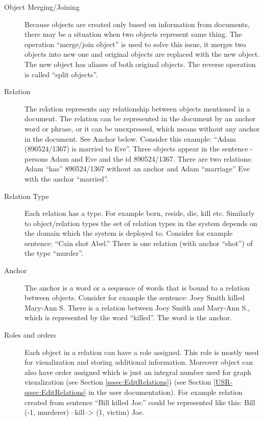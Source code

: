 \begin{description}
\item[Object Merging/Joining]
Because objects are created only based on information from documents, there may
be a situation when two objects represent same thing. The operation ``merge/join
object'' is used to solve this issue, it merges two objects into new one and
original objects are replaced with the new object. The new object has aliases of
both original objects. The reverse operation is called ``split objects''.

\item[Relation]
The relation represents any relationship between objects mentioned in a
document. The relation can be represented in the document by an anchor word or
phrase, or it can be unexpressed, which means without any anchor in the
document. See Anchor below.
Consider this example: ``Adam (890524/1367) is married to Eve''. Three objects
appear in the sentence - persons Adam and Eve and the id 890524/1367. There
are two relations: Adam ``has'' 890524/1367 without an anchor and Adam ``marriage''
Eve with the anchor ``married''.

\item[Relation Type]
Each relation has a type. For example born, reside, die, kill etc. Similarly to
object/relation types the set of relation types in the system depends on the
domain which the system is deployed to. Consider for example sentence: ``Cain shot
Abel.'' There is one relation (with anchor ``shot'') of the type ``murder''. 

\item[Anchor]
The anchor is a word or a sequence of words that is bound to a relation between
objects. Consider for example the sentence: Joey Smith killed Mary-Ann S. There
is a relation between Joey Smith and Mary-Ann S., which is represented by the
word ``killed''. The word is the anchor.

\item[Roles and orders]
Each object in a relation can have a role assigned. This role is mostly used
for visualization and storing additional information. Moreover object can also
have order assigned which is just an integral number used for graph
visualization\ifdefined\USRDOC{} (see Section \ref{sssec:EditRelations})\fi{}
\ifdefined\DEVDOC{} (see Section \ref{USR-sssec:EditRelations} in the user
documentation)\fi{}. For example relation created from sentence
``Bill killed Joe.'' could be represented like this:
Bill (-1, murderer) --kill--> (1, victim) Joe.
\end{description}

